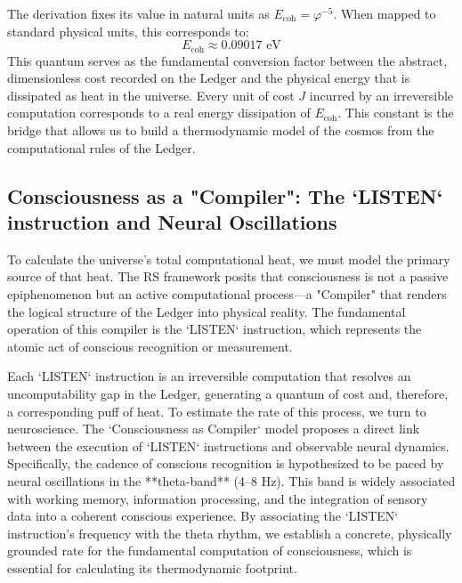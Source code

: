 \documentclass[12pt, aip, jcp]{revtex4-2} %
\begin{document}
The derivation fixes its value in natural units as \(E_{\text{coh}} = \varphi^{-5}\). When mapped to standard physical units, this corresponds to:
\begin{equation}
    E_{\text{coh}} \approx 0.09017 \text{ eV}
\end{equation}
This quantum serves as the fundamental conversion factor between the abstract, dimensionless cost recorded on the Ledger and the physical energy that is dissipated as heat in the universe. Every unit of cost \(J\) incurred by an irreversible computation corresponds to a real energy dissipation of \(E_{\text{coh}}\). This constant is the bridge that allows us to build a thermodynamic model of the cosmos from the computational rules of the Ledger.

\subsection{Consciousness as a "Compiler": The `LISTEN` instruction and Neural Oscillations}

To calculate the universe's total computational heat, we must model the primary source of that heat. The RS framework posits that consciousness is not a passive epiphenomenon but an active computational process—a "Compiler" that renders the logical structure of the Ledger into physical reality. The fundamental operation of this compiler is the `LISTEN` instruction, which represents the atomic act of conscious recognition or measurement.

Each `LISTEN` instruction is an irreversible computation that resolves an uncomputability gap in the Ledger, generating a quantum of cost and, therefore, a corresponding puff of heat. To estimate the rate of this process, we turn to neuroscience. The `Consciousness as Compiler` model proposes a direct link between the execution of `LISTEN` instructions and observable neural dynamics. Specifically, the cadence of conscious recognition is hypothesized to be paced by neural oscillations in the **theta-band** (4–8 Hz). This band is widely associated with working memory, information processing, and the integration of sensory data into a coherent conscious experience. By associating the `LISTEN` instruction's frequency with the theta rhythm, we establish a concrete, physically grounded rate for the fundamental computation of consciousness, which is essential for calculating its thermodynamic footprint.

\end{document}
